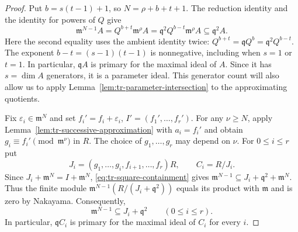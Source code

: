 \documentclass[11pt,reqno]{amsart}
\numberwithin{equation}{section}
\theoremstyle{definition}
\begin{document}
\begin{proof}
Put $b=s(t-1)+1$, so $N=\rho+b+t+1$. The reduction identity and the
identity for powers of $Q$ give
\begin{equation}\label{eq:tr-square-containment}
 \mathfrak m^{N-1}A
   =Q^{b+t}\mathfrak m^\rho A
   =\mathfrak q^2Q^{b-t}\mathfrak m^\rho A
   \subseteq\mathfrak q^2A.
\end{equation}
Here the second equality uses the ambient identity twice:
$Q^{b+t}=\mathfrak qQ^b=\mathfrak q^2Q^{b-t}$.
The exponent $b-t=(s-1)(t-1)$ is nonnegative, including when
$s=1$ or $t=1$.
In particular, $\mathfrak qA$ is primary for the maximal ideal
of $A$. Since it has $s=\dim A$ generators, it is a parameter
ideal. This generator count will also allow us to apply
Lemma~\ref{lem:tr-parameter-intersection} to the approximating quotients.

Fix $\varepsilon_i\in\mathfrak m^N$ and set
$f_i'=f_i+\varepsilon_i$, $I'=(f_1',\ldots,f_r')$.
For any $\nu\geq N$, apply Lemma~\ref{lem:tr-successive-approximation} with
$a_i=f_i'$ and obtain $g_i\equiv f_i'\pmod{\mathfrak m^\nu}$ in $R$.
The choice of $g_1,\ldots,g_r$ may depend on $\nu$.
For $0\leq i\leq r$ put
\[
 J_i=(g_1,\ldots,g_i,f_{i+1},\ldots,f_r)R,
 \qquad C_i=R/J_i.
\]
Since $J_i+\mathfrak m^N=I+\mathfrak m^N$,
\eqref{eq:tr-square-containment} gives
$\mathfrak m^{N-1}\subseteq J_i+\mathfrak q^2+\mathfrak m^N$.
Thus the finite module
$\mathfrak m^{N-1}(R/(J_i+\mathfrak q^2))$
equals its product with $\mathfrak m$ and is zero by Nakayama.
Consequently,
\begin{equation}\label{eq:tr-all-square-containments}
 \mathfrak m^{N-1}\subseteq J_i+\mathfrak q^2
 \qquad(0\leq i\leq r).
\end{equation}
In particular, $\mathfrak qC_i$ is primary for the maximal ideal
of $C_i$ for every $i$.


\end{proof}
\end{document}
